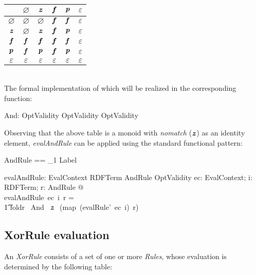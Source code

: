 \documentclass[fuzz]{llncs}
\def\pass{\textbf{\textit{p}}}
\def\fail{\textbf{\textit{f}}}
\def\none{\varnothing}
\def\error{\varepsilon}
\def\nomatch{\textbf{\textit{z}}}
\def\zc{\textit}
\def\zcb{\textit{\textbf}}
\begin{document}
\begin{tabular}{c || c | c | c | c | c |}
   \hline 
   \zcb{And} & $\none$ & $\nomatch$ & $\fail$ & $\pass$ & $\error$ \\
   \hline \hline
   $\none$ & $\none$ & $\none$ & $\fail$ & $\fail$ & $\error$ \\ \hline
   $\nomatch$ & $\none$ & $\nomatch$ & $\fail$ & $\pass$ & $\error$ \\ \hline
   $\fail$ & $\fail$ & $\fail$ & $\fail$ & $\fail$ & $\error$ \\ \hline
   $\pass$ & $\fail$ & $\pass$ & $\fail$ & $\pass$ & $\error$ \\ \hline
   $\error$ & $\error$ & $\error$ & $\error$ & $\error$ & $\error$ \\ \hline 
\end{tabular} \\

The formal implementation of which will be realized in the corresponding function:
\begin{gendef}
   And: OptValidity \fun OptValidity \fun OptValidity
\end{gendef}

Observing that the above table is a monoid with \zc{nomatch} ($\nomatch$) as an identity
element, \zc{evalAndRule} can be applied using the standard functional pattern:
\begin{zed}
AndRule == \seq_1 Label
\end{zed}
\begin{gendef}
   evalAndRule: EvalContext \fun RDFTerm \fun AndRule \fun OptValidity
\where
   \forall ec: EvalContext; i: RDFTerm; r: AndRule  @ \\
	evalAndRule~ec~i~r = \\
\t1	foldr~ And~ \nomatch ~ (map~(evalRule'~ec~i)~r)
\end{gendef}

\subsection{XorRule evaluation}
An \zc{XorRule} consists of a set of one or more \zc{Rules}, whose evaluation is determined
by the following table: \\
\end{document}
